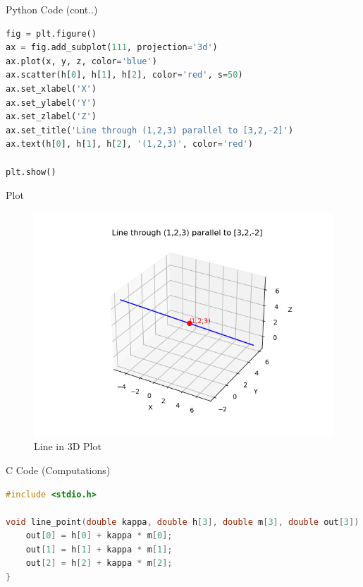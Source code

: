 \documentclass{beamer}
\begin{document}
\begin{frame}[fragile]{Python Code (cont..)}
\begin{lstlisting}[language=Python]
fig = plt.figure()
ax = fig.add_subplot(111, projection='3d')
ax.plot(x, y, z, color='blue')
ax.scatter(h[0], h[1], h[2], color='red', s=50)
ax.set_xlabel('X')
ax.set_ylabel('Y')
ax.set_zlabel('Z')
ax.set_title('Line through (1,2,3) parallel to [3,2,-2]')
ax.text(h[0], h[1], h[2], '(1,2,3)', color='red')

plt.show()
\end{lstlisting}
\end{frame}

\begin{frame}[fragile]{Plot}
\begin{figure}[H]\centering
\includegraphics[width=1\columnwidth]{figs/plt.png}
\caption{Line in 3D Plot}
\label{fig:plt}
\end{figure}
\end{frame}


\begin{frame}[fragile]{C Code (Computations)}
\begin{lstlisting}[language=C]
#include <stdio.h>

void line_point(double kappa, double h[3], double m[3], double out[3]) {
    out[0] = h[0] + kappa * m[0];
    out[1] = h[1] + kappa * m[1];
    out[2] = h[2] + kappa * m[2];
}
\end{lstlisting}
\end{frame}
\end{document}
